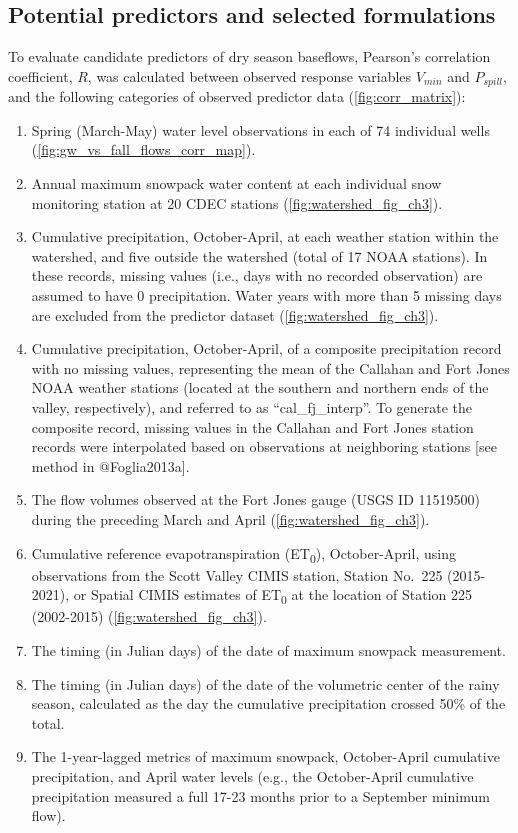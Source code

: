 \documentclass[
]{article}
\providecommand{\tightlist}{%
  \setlength{\itemsep}{0pt}\setlength{\parskip}{0pt}}
\begin{document}
\hypertarget{potential-predictors-and-selected-formulations}{%
\subsection{Potential predictors and selected
formulations}\label{potential-predictors-and-selected-formulations}}

To evaluate candidate predictors of dry season baseflows, Pearson's
correlation coefficient, \(R\), was calculated between observed response
variables \(V_{min}\) and \(P_{spill}\), and the following categories of
observed predictor data (\autoref{fig:corr_matrix}):

\begin{enumerate}
\def\labelenumi{\arabic{enumi}.}
\tightlist
\item
  Spring (March-May) water level observations in each of 74 individual
  wells (\autoref{fig:gw_vs_fall_flows_corr_map}).
\item
  Annual maximum snowpack water content at each individual snow
  monitoring station at 20 CDEC stations
  (\autoref{fig:watershed_fig_ch3}).
\item
  Cumulative precipitation, October-April, at each weather station
  within the watershed, and five outside the watershed (total of 17 NOAA
  stations). In these records, missing values (i.e., days with no
  recorded observation) are assumed to have 0 precipitation. Water years
  with more than 5 missing days are excluded from the predictor dataset
  (\autoref{fig:watershed_fig_ch3}).
\item
  Cumulative precipitation, October-April, of a composite precipitation
  record with no missing values, representing the mean of the Callahan
  and Fort Jones NOAA weather stations (located at the southern and
  northern ends of the valley, respectively), and referred to as
  ``cal\_fj\_interp''. To generate the composite record, missing values
  in the Callahan and Fort Jones station records were interpolated based
  on observations at neighboring stations {[}see method in
  @Foglia2013a{]}.
\item
  The flow volumes observed at the Fort Jones gauge (USGS ID 11519500)
  during the preceding March and April
  (\autoref{fig:watershed_fig_ch3}).
\item
  Cumulative reference evapotranspiration (ET\textsubscript{0}),
  October-April, using observations from the Scott Valley CIMIS station,
  Station No.~225 (2015-2021), or Spatial CIMIS estimates of
  ET\textsubscript{0} at the location of Station 225 (2002-2015)
  (\autoref{fig:watershed_fig_ch3}).
\item
  The timing (in Julian days) of the date of maximum snowpack
  measurement.
\item
  The timing (in Julian days) of the date of the volumetric center of
  the rainy season, calculated as the day the cumulative precipitation
  crossed 50\% of the total.
\item
  The 1-year-lagged metrics of maximum snowpack, October-April
  cumulative precipitation, and April water levels (e.g., the
  October-April cumulative precipitation measured a full 17-23 months
  prior to a September minimum flow).
\end{enumerate}
\end{document}
